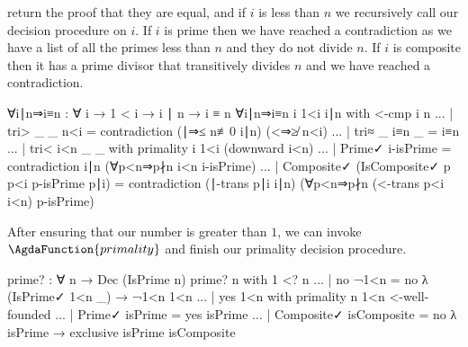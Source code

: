 \documentclass[./Thesis.tex]{subfiles}
\begin{document}
return the proof that they are equal, and if $i$ is less than $n$ we
recursively call our decision procedure on $i$. If $i$ is prime then we have
reached a contradiction as we have a list of all the primes less than $n$ and
they do not divide $n$. If $i$ is composite then it has a prime divisor that
transitively divides $n$ and we have reached a contradiction.
\begin{code}
    ∀i∣n⇒i≡n : ∀ {i} → 1 < i → i ∣ n → i ≡ n
    ∀i∣n⇒i≡n {i} 1<i i∣n with <-cmp i n
    ... | tri> _ _ n<i = contradiction (∣⇒≤ n≢0 i∣n) (<⇒≱ n<i)
    ... | tri≈ _ i≡n _ = i≡n
    ... | tri< i<n _ _ with primality i 1<i (downward i<n)
    ...   | Prime✓ i-isPrime
          = contradiction i∣n (∀p<n⇒p∤n i<n i-isPrime)
    ...   | Composite✓ (IsComposite✓ p p<i p-isPrime p∣i)
          = contradiction (∣-trans p∣i i∣n) (∀p<n⇒p∤n (<-trans p<i i<n) p-isPrime)
\end{code}
After ensuring that our number is greater than $1$, we can invoke
$\AgdaFunction{primality}$ and finish our primality decision procedure.
\begin{code}
  prime? : ∀ n → Dec (IsPrime n)
  prime? n with 1 <? n
  ... | no ¬1<n = no λ { (IsPrime✓ 1<n _) → ¬1<n 1<n }
  ... | yes 1<n with primality n 1<n <-well-founded
  ... | Prime✓ isPrime = yes isPrime
  ... | Composite✓ isComposite = no λ { isPrime → exclusive isPrime isComposite }
\end{code}
\end{document}
